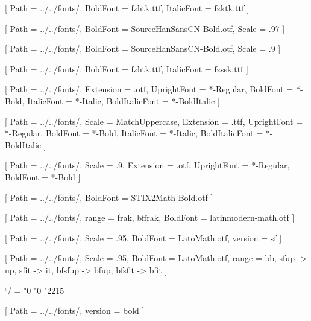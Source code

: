 \usepackage{geometry}
\geometry{
    paperwidth = 155mm,
    paperheight = 235mm,
    outer = 20mm,
    inner = 20mm,
    top = 25mm,
    bottom = 20mm
}

\usepackage[PunctStyle=kaiming]{xeCJK}
\usepackage{amsmath}
\usepackage{unicode-math}

[
    Path = ../../fonts/,
    BoldFont = fzhtk.ttf,
    ItalicFont = fzktk.ttf
]

[
    Path = ../../fonts/,
    BoldFont = SourceHanSansCN-Bold.otf,
    Scale = .97
]

[
    Path = ../../fonts/,
    BoldFont = SourceHanSansCN-Bold.otf,
    Scale = .9
]

[
    Path = ../../fonts/,
    BoldFont = fzhtk.ttf,
    ItalicFont = fzssk.ttf
]

\setmainfont{STIX2Text}[
    Path = ../../fonts/,
    Extension = .otf,
    UprightFont = *-Regular,
    BoldFont = *-Bold,
    ItalicFont = *-Italic,
    BoldItalicFont = *-BoldItalic
]

\setsansfont{Lato}[
    Path = ../../fonts/,
    Scale = MatchUppercase,
    Extension = .ttf,
    UprightFont = *-Regular,
    BoldFont = *-Bold,
    ItalicFont = *-Italic,
    BoldItalicFont = *-BoldItalic
]

\setmonofont{FiraMono}[
    Path = ../../fonts/,
    Scale = .9,
    Extension = .otf,
    UprightFont = *-Regular,
    BoldFont = *-Bold
]

[
    Path = ../../fonts/,
    BoldFont = STIX2Math-Bold.otf
]

[
    Path = ../../fonts/,
    range = {frak, bffrak},
    BoldFont = latinmodern-math.otf
]

[
    Path = ../../fonts/,
    Scale = .95,
    BoldFont = LatoMath.otf,
    version = sf
]

[
    Path = ../../fonts/,
    Scale = .95,
    BoldFont = LatoMath.otf,
    range = {bb, sfup -> up, sfit -> it, bfsfup -> bfup, bfsfit -> bfit}
]


\Umathcode`/  =  "0 "0 "2215    %

\setmathfontface{}[
    Path = ../../fonts/,
    version = bold
]

